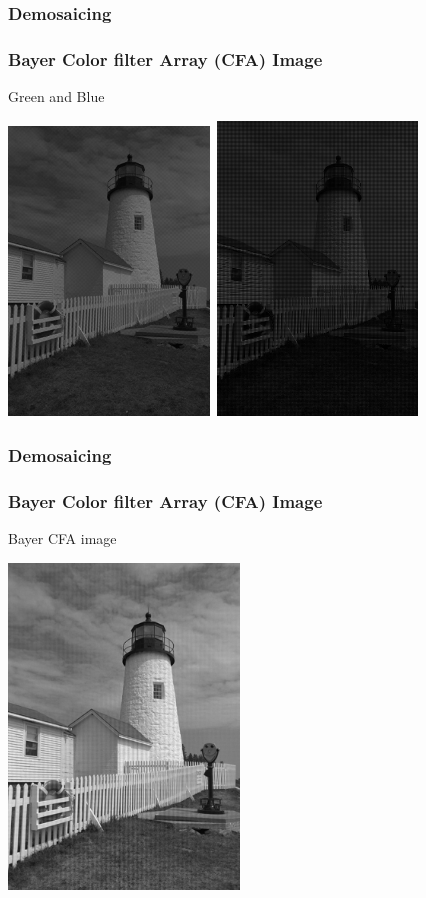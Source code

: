 \documentclass{beamer}
\begin{document}
\begin{frame}
\frametitle{Demosaicing}
\frametitle{Bayer Color filter Array (CFA) Image}
\scriptsize{Green and Blue}
\begin{center}
\includegraphics[width = 0.4\textwidth, height = 0.6\textheight]{images/L7_lighthouseGreenSubSam.png}\
\includegraphics[width = 0.4\textwidth, height = 0.6\textheight]{images/L7_lighthouseBlueSubSam.png}
\end{center}
\end{frame}

\begin{frame}
\frametitle{Demosaicing}
\frametitle{Bayer Color filter Array (CFA) Image}
\scriptsize{Bayer CFA image}
\begin{center}
\includegraphics[width = 0.46\textwidth, height = 0.76\textheight]{images/L7_lighthouseBayerCFA.png}
\end{center}
\end{frame}
\end{document}
